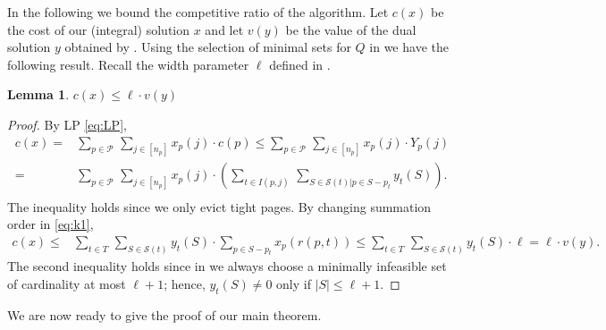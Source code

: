 \documentclass[11pt]{article}
\newcommand{\cP}{{\mathcal{P}}}
\newcommand{\cS}{{\mathcal{S}}}
\newtheorem{lemma}[thm]{Lemma}
\begin{document}
In the following we bound the competitive ratio of the algorithm. %
Let $c(x)$ be the cost of our (integral) solution $x$ and let $v(y)$ be the value of the dual solution $y$ obtained by . Using the selection of minimal sets for $Q$ in  we have the following result. 
Recall the width parameter $\ell$ defined in . 


	\begin{lemma}
	\label{lem:k}
$c(x) \leq \ell \cdot v(y)$
\end{lemma}

\begin{proof}
By LP \eqref{eq:LP},
\begin{equation}
	\label{eq:k1}
	\begin{aligned}
 c(x) ={} & \sum_{p \in \cP~} \sum_{j \in [n_p]}  x_p(j) \cdot c(p)
	\leq{}   \sum_{p \in \cP~} \sum_{j \in [n_p]} x_p(j) \cdot Y_p(j) \\
	={} &   \sum_{p \in \cP~} \sum_{j \in [n_p]} x_p(j) \cdot \left(  \sum_{t \in I(p,j)~} \sum_{S \in \cS(t)\big|p \in S-p_t} y_t(S) \right).\\
	\end{aligned}
\end{equation} The inequality holds since we only evict tight pages. By changing summation order in \eqref{eq:k1}, 
\begin{equation*}
	\label{eq:k2}
	\begin{aligned}
		c(x) \leq{} & \sum_{t \in T~} \sum_{S  \in \cS(t)} y_t(S) \cdot \sum_{p \in S -p_t} x_p(r(p,t)) \leq \sum_{t \in T~} \sum_{S  \in \cS(t)} y_t(S) \cdot \ell = \ell \cdot v(y). 
	\end{aligned}
\end{equation*} The second inequality holds since in  we always choose a minimally infeasible set of cardinality at most $\ell +1$; hence, $y_t(S) \neq 0$ only if $|S| \leq \ell+1$. 
\end{proof}
\noindent{}
We are now ready to give the proof of our main theorem. 
\end{document}
